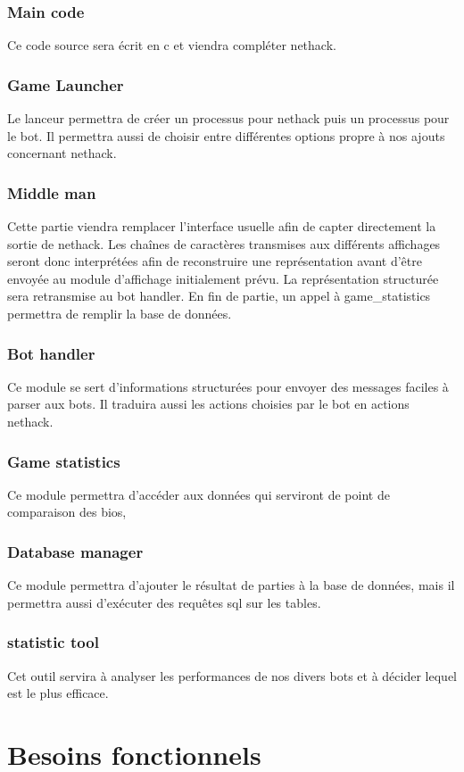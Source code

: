 \documentclass[12pt]{article}
\begin{document}
\subsubsection*{Main code}
Ce code source sera écrit en c et viendra compléter nethack.
\subsubsection*{Game Launcher}
Le lanceur permettra de créer un processus pour nethack puis un processus pour le bot. Il permettra aussi de choisir entre différentes options propre à nos ajouts concernant nethack.
\subsubsection*{Middle man}
Cette partie viendra remplacer l'interface usuelle afin de capter directement la sortie de nethack. Les chaînes de caractères transmises aux différents affichages seront donc interprétées afin de reconstruire une représentation avant d'être envoyée au module d'affichage initialement prévu.
La représentation structurée sera retransmise au bot handler. En fin de partie, un appel à game\_statistics permettra de remplir la base de données.
\subsubsection*{Bot handler}
Ce module se sert d'informations structurées pour envoyer des messages faciles à parser aux bots. Il traduira aussi les actions choisies par le bot en actions nethack.
\subsubsection*{Game statistics}
Ce module permettra d'accéder aux données qui serviront de point de comparaison des bios,
\subsubsection*{Database manager}
Ce module permettra d'ajouter le résultat de parties à la base de données, mais il permettra aussi d'exécuter des requêtes sql sur les tables.
\subsubsection*{statistic tool}
Cet outil servira à analyser les performances de nos divers bots et à décider lequel est le plus efficace.


\section{Besoins fonctionnels}
\end{document}
